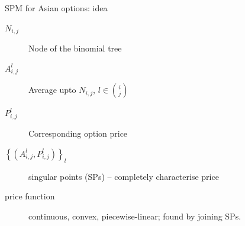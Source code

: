 \documentclass[utf8,t,compress,xcolor=svgnames,handout]{beamer}
\begin{document}
	
	\begin{frame}{SPM for Asian options: idea}
		\begin{description}
			\item[$ N_{i,j} $] Node of the binomial tree
			\item[$ A_{i,j}^l $] Average upto $ N_{i,j} $, $ l \in \binom{i}{j} $
			\item[$ P_{i,j}^l $] Corresponding option price
			\item[$ \left\lbrace \left( A_{i,j}^l, P_{i,j}^l \right) \right\rbrace_l $] \alert{singular points} (SPs) -- \alert{completely characterise price}
			\item[price function] continuous, convex, piecewise-linear; found by joining SPs.
		\end{description}
	\end{frame}
	
\end{document}

